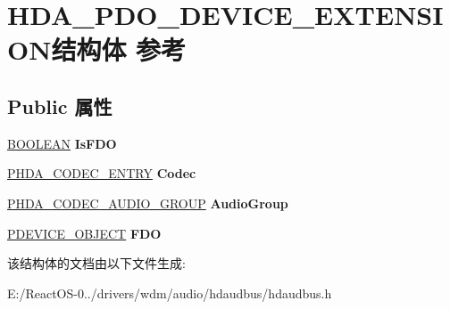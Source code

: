 \hypertarget{struct_h_d_a___p_d_o___d_e_v_i_c_e___e_x_t_e_n_s_i_o_n}{}\section{H\+D\+A\+\_\+\+P\+D\+O\+\_\+\+D\+E\+V\+I\+C\+E\+\_\+\+E\+X\+T\+E\+N\+S\+I\+O\+N结构体 参考}
\label{struct_h_d_a___p_d_o___d_e_v_i_c_e___e_x_t_e_n_s_i_o_n}
\subsection*{Public 属性}
\begin{DoxyCompactItemize}
\item 
\mbox{\label{struct_h_d_a___p_d_o___d_e_v_i_c_e___e_x_t_e_n_s_i_o_n_aa33c8f9596c9bcd609cf77a429345095}} 
\hyperlink{_processor_bind_8h_a112e3146cb38b6ee95e64d85842e380a}{B\+O\+O\+L\+E\+AN} {\bfseries Is\+F\+DO}
\item 
\mbox{\label{struct_h_d_a___p_d_o___d_e_v_i_c_e___e_x_t_e_n_s_i_o_n_a698cc80fe8174fa1d2f6c5029a99eeee}} 
\hyperlink{struct_h_d_a___c_o_d_e_c___e_n_t_r_y}{P\+H\+D\+A\+\_\+\+C\+O\+D\+E\+C\+\_\+\+E\+N\+T\+RY} {\bfseries Codec}
\item 
\mbox{\label{struct_h_d_a___p_d_o___d_e_v_i_c_e___e_x_t_e_n_s_i_o_n_a28fd68bdb5052c2f6d4de41f35f6f30b}} 
\hyperlink{struct_h_d_a___c_o_d_e_c___a_u_d_i_o___g_r_o_u_p}{P\+H\+D\+A\+\_\+\+C\+O\+D\+E\+C\+\_\+\+A\+U\+D\+I\+O\+\_\+\+G\+R\+O\+UP} {\bfseries Audio\+Group}
\item 
\mbox{\label{struct_h_d_a___p_d_o___d_e_v_i_c_e___e_x_t_e_n_s_i_o_n_a822711f6155a25107a06c34ef66e0f62}} 
\hyperlink{struct___d_e_v_i_c_e___o_b_j_e_c_t}{P\+D\+E\+V\+I\+C\+E\+\_\+\+O\+B\+J\+E\+CT} {\bfseries F\+DO}
\end{DoxyCompactItemize}


该结构体的文档由以下文件生成\+:\begin{DoxyCompactItemize}
\item 
E\+:/\+React\+O\+S-\/0../drivers/wdm/audio/hdaudbus/hdaudbus.\+h\end{DoxyCompactItemize}
